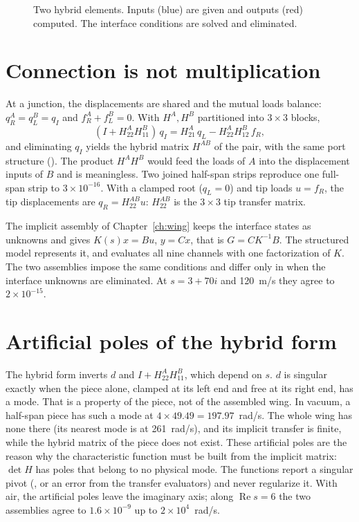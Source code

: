\begin{figure}[htbp]\centering

\caption{Two hybrid elements. Inputs (blue) are given and outputs (red)
computed. The interface conditions are solved and eliminated.}
\label{fig:hybridports}
\end{figure}

\section{Connection is not multiplication}

At a junction, the displacements are shared and the mutual loads balance:
$q_R^A=q_L^B=q_I$ and $f_R^A+f_L^B=0$. With $H^A,H^B$ partitioned into
$3\times3$ blocks,
\begin{equation}
 (I+H^A_{22}H^B_{11})\,q_I=H^A_{21}\,q_L-H^A_{22}H^B_{12}\,f_R,
\end{equation}
and eliminating $q_I$ yields the hybrid matrix $H^{AB}$ of the pair, with
the same port structure (). The product
$H^AH^B$ would feed the loads of $A$ into the displacement inputs of $B$
and is meaningless. Two joined half-span strips reproduce one full-span
strip to $3\times10^{-16}$. With a clamped root ($q_L=0$) and tip loads
$u=f_R$, the tip displacements are $q_R=H^{AB}_{22}u$: $H^{AB}_{22}$ is the
$3\times3$ tip transfer matrix.

The implicit assembly of Chapter~\ref{ch:wing} keeps the interface states
as unknowns and gives $K(s)x=Bu$, $y=Cx$, that is $G=CK^{-1}B$. The
structured model  represents it, and  evaluates
all nine channels with one factorization of $K$. The two assemblies
impose the same conditions and differ only in when the interface unknowns
are eliminated. At $s=3+70i$ and 120~m/s they agree to $2\times10^{-15}$.

\section{Artificial poles of the hybrid form}

The hybrid form inverts $d$ and $I+H^A_{22}H^B_{11}$, which depend on
$s$. $d$ is singular exactly when the piece alone, clamped at its left
end and free at its right end, has a mode. That is a property of the
piece, not of the assembled wing. In vacuum, a half-span piece has such a
mode at $4\times49.49=197.97$~rad/s. The whole wing has none there (its
nearest mode is at 261~rad/s), and its implicit transfer is finite, while
the hybrid matrix of the piece does not exist. These artificial poles are
the reason why the characteristic function must be built from the
implicit matrix: $\det H$ has poles that belong to no physical mode. The
functions report a singular pivot (, or an error
from the transfer evaluators) and never regularize it. With air, the
artificial poles leave the imaginary axis; along $\operatorname{Re}s=6$ the
two assemblies agree to $1.6\times10^{-9}$ up to $2\times10^4$~rad/s.

